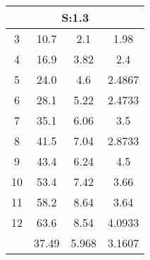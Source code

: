 \begin{table}[H]
		\begin{tabular}{c|ccc}
			\multicolumn{4}{c}{S:1.3}\\\hline
			3 & 10.7 & 2.1 & 1.98\\
			4 & 16.9 & 3.82 & 2.4\\
			5 & 24.0 & 4.6 & 2.4867\\
			6 & 28.1 & 5.22 & 2.4733\\
			7 & 35.1 & 6.06 & 3.5\\
			8 & 41.5 & 7.04 & 2.8733\\
			9 & 43.4 & 6.24 & 4.5\\
			10 & 53.4 & 7.42 & 3.66\\
			11 & 58.2 & 8.64 & 3.64\\
			12 & 63.6 & 8.54 & 4.0933\\
			\hline
			& 37.49 & 5.968 & 3.1607\\
		\end{tabular}
	\end{table}